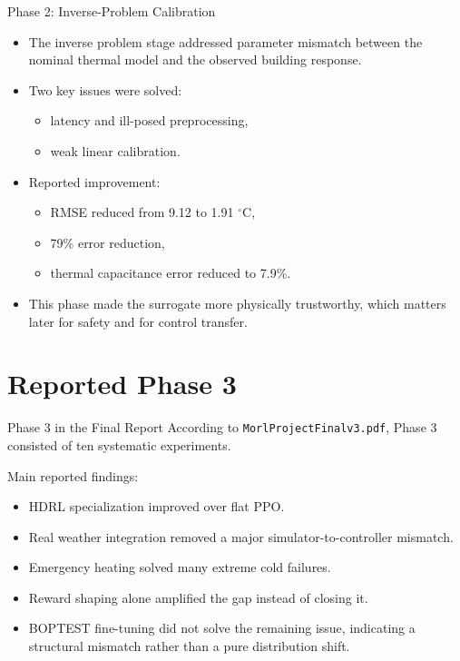 \documentclass[aspectratio=169,11pt]{beamer}
\newcommand{\degc}{\ensuremath{^\circ\mathrm{C}}}
\begin{document}
\begin{frame}{Phase 2: Inverse-Problem Calibration}
  \begin{itemize}
    \item The inverse problem stage addressed parameter mismatch between the nominal thermal model and the observed building response.
    \item Two key issues were solved:
    \begin{itemize}
      \item latency and ill-posed preprocessing,
      \item weak linear calibration.
    \end{itemize}
    \item Reported improvement:
    \begin{itemize}
      \item RMSE reduced from 9.12 to 1.91 \degc{},
      \item 79\% error reduction,
      \item thermal capacitance error reduced to 7.9\%.
    \end{itemize}
    \item This phase made the surrogate more physically trustworthy, which matters later for safety and for control transfer.
  \end{itemize}
\end{frame}

\section{Reported Phase 3}

\begin{frame}{Phase 3 in the Final Report}
  According to \texttt{MorlProjectFinalv3.pdf}, Phase 3 consisted of ten systematic experiments.

  \vspace{0.5em}
  Main reported findings:
  \begin{itemize}
    \item HDRL specialization improved over flat PPO.
    \item Real weather integration removed a major simulator-to-controller mismatch.
    \item Emergency heating solved many extreme cold failures.
    \item Reward shaping alone amplified the gap instead of closing it.
    \item BOPTEST fine-tuning did not solve the remaining issue, indicating a structural mismatch rather than a pure distribution shift.
  \end{itemize}
\end{frame}
\end{document}

